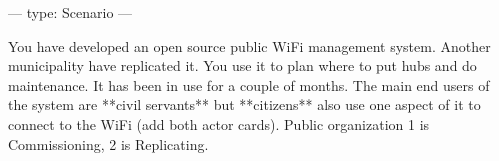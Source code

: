 ---
type: Scenario
---

You have developed an open source public WiFi management system. Another municipality have replicated it. You use it to plan where to put hubs and do maintenance. It has been in use for a couple of months. The main end users of the system are **civil servants** but **citizens** also use one aspect of it to connect to the WiFi (add both actor cards). Public organization 1 is Commissioning, 2 is Replicating.
